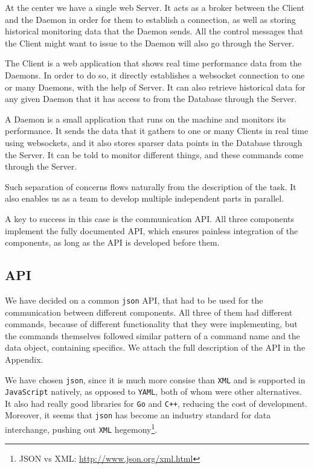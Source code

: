 \documentclass{l3proj}
\begin{document}
At the center we have a single web Server. It acts as a broker between the Client and the Daemon in order for them to establish a connection, as well as storing historical monitoring data that the Daemon sends. All the control messages that the Client might want to issue to the Daemon will also go through the Server.

The Client is a web application that shows real time performance data from the Daemons. In order to do so, it directly establishes a websocket connection to one or many Daemons, with the help of Server. It can also retrieve historical data for any given Daemon that it has access to from the Database through the Server.

A Daemon is a small application that runs on the machine and monitors its performance. It sends the data that it gathers to one or many Clients in real time using websockets, and it also stores sparser data points in the Database through the Server. It can be told to monitor different things, and these commands come through the Server.

Such separation of concerns flows naturally from the description of the task. It also enables us as a team to develop multiple independent parts in parallel.

A key to success in this case is the communication API. All three components implement the fully documented API, which ensures painless integration of the components, as long as the API is developed before them.

\subsection{API}

We have decided on a common \texttt{json} API, that had to be used for the communication between different components. All three of them had different commands, because of different functionality that they were implementing, but the commands themselves followed similar pattern of a command name and the data object, containing specifics. We attach the full description of the API in the Appendix. 

We have chosen \texttt{json}, since it is much more consise than \texttt{XML} and is supported in \texttt{JavaScript} natively, as opposed to \texttt{YAML}, both of whom were other alternatives. It also had really good libraries for \texttt{Go} and \texttt{C++}, reducing the cost of development. Moreover, it seems that \texttt{json} has become an industry standard for data interchange, pushing out \texttt{XML} hegemony\footnote{\raggedright{}JSON vs XML: \url{http://www.json.org/xml.html}}. 
\end{document}
